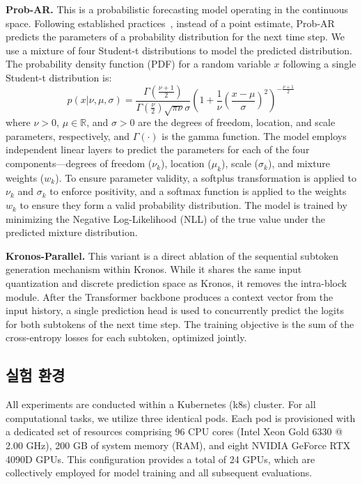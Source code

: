 \noindent\textbf{Prob-AR.} This is a probabilistic forecasting model operating in the continuous space. Following established practices~\cite{yao2024towards}, instead of a point estimate, Prob-AR predicts the parameters of a probability distribution for the next time step. We use a mixture of four Student-t distributions to model the predicted distribution. The probability density function (PDF) for a random variable $x$ following a single Student-t distribution is:
\begin{equation}
p(x | \nu, \mu, \sigma) = \frac{\Gamma(\frac{\nu+1}{2})}{\Gamma(\frac{\nu}{2})\sqrt{\pi\nu}\sigma} \left(1 + \frac{1}{\nu}\left(\frac{x-\mu}{\sigma}\right)^2\right)^{-\frac{\nu+1}{2}}
\end{equation}
where $\nu > 0$, $\mu \in \mathbb{R}$, and $\sigma > 0$ are the degrees of freedom, location, and scale parameters, respectively, and $\Gamma(\cdot)$ is the gamma function. The model employs independent linear layers to predict the parameters for each of the four components—degrees of freedom ($\nu_k$), location ($\mu_k$), scale ($\sigma_k$), and mixture weights ($w_k$). To ensure parameter validity, a softplus transformation is applied to $\nu_k$ and $\sigma_k$ to enforce positivity, and a softmax function is applied to the weights $w_k$ to ensure they form a valid probability distribution. The model is trained by minimizing the Negative Log-Likelihood (NLL) of the true value under the predicted mixture distribution.

\noindent\textbf{Kronos-Parallel.} This variant is a direct ablation of the sequential subtoken generation mechanism within Kronos. While it shares the same input quantization and discrete prediction space as Kronos, it removes the intra-block module. After the Transformer backbone produces a context vector from the input history, a single prediction head is used to concurrently predict the logits for both subtokens of the next time step. The training objective is the sum of the cross-entropy losses for each subtoken, optimized jointly.

\subsection{실험 환경}
\label{sec:exp_environment}

All experiments are conducted within a Kubernetes (k8s) cluster. For all computational tasks, we utilize three identical pods. Each pod is provisioned with a dedicated set of resources comprising 96 CPU cores (Intel Xeon Gold 6330 @ 2.00 GHz), 200 GB of system memory (RAM), and eight NVIDIA GeForce RTX 4090D GPUs. This configuration provides a total of 24 GPUs, which are collectively employed for model training and all subsequent evaluations.

